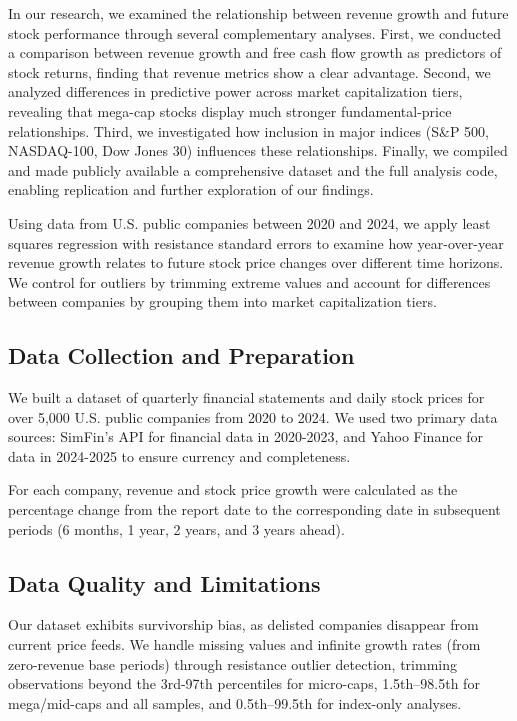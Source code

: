 \documentclass[11pt]{article}
\begin{document}
In our research, we examined the relationship between revenue growth and future stock performance through several complementary analyses. First, we conducted a comparison between revenue growth and free cash flow growth as predictors of stock returns, finding that revenue metrics show a clear advantage. Second, we analyzed differences in predictive power across market capitalization tiers, revealing that mega-cap stocks display much stronger fundamental-price relationships. Third, we investigated how inclusion in major indices (S\&P 500, NASDAQ-100, Dow Jones 30) influences these relationships. Finally, we compiled and made publicly available a comprehensive dataset and the full analysis code, enabling replication and further exploration of our findings.

Using data from U.S. public companies between 2020 and 2024, we apply least squares regression with resistance standard errors to examine how year-over-year revenue growth relates to future stock price changes over different time horizons. We control for outliers by trimming extreme values and account for differences between companies by grouping them into market capitalization tiers.

\subsection{Data Collection and Preparation}

We built a dataset of quarterly financial statements and daily stock prices for over 5,000 U.S. public companies from 2020 to 2024. We used two primary data sources: SimFin's API for financial data in 2020-2023, and Yahoo Finance for data in 2024-2025 to ensure currency and completeness.

For each company, revenue and stock price growth were calculated as the percentage change from the report date to the corresponding date in subsequent periods (6 months, 1 year, 2 years, and 3 years ahead).

\subsection{Data Quality and Limitations} 

Our dataset exhibits survivorship bias, as delisted companies disappear from current price feeds. We handle missing values and infinite growth rates (from zero-revenue base periods) through resistance outlier detection, trimming observations beyond the 3rd-97th percentiles for micro-caps, 1.5th–98.5th for mega/mid-caps and all samples, and 0.5th–99.5th for index-only analyses.
\end{document}

